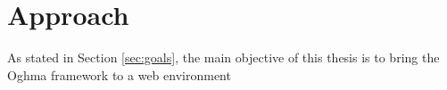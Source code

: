 \chapter{Approach}\label{chap:approach}

As stated in Section \ref{sec:goals}, the main objective of this thesis is to bring the Oghma framework to a web environment

